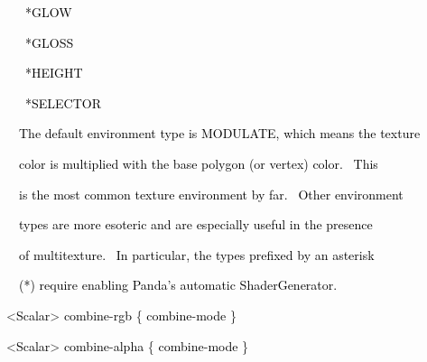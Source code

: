 \documentclass[a4paper]{article}
\newcommand\textstyleOOoComputerKeyWord[1]{\textrm{\textcolor[rgb]{0.0,0.0,0.5019608}{#1}}}
\newcommand\textstyleOOoAssemblerSpecialChar[1]{\textrm{\textcolor[rgb]{0.0,0.5019608,0.0}{#1}}}
\newcommand\textstyleOOoAssemblerIdent[1]{\textrm{\textcolor{black}{#1}}}
\begin{document}
{\color{black}
\textstyleOOoComputerKeyWord{\textcolor{black}{\ \ \ \ \ *GLOW}}}

{\color{black}
\textstyleOOoComputerKeyWord{\textcolor{black}{\ \ \ \ \ *GLOSS}}}

{\color{black}
\textstyleOOoComputerKeyWord{\textcolor{black}{\ \ \ \ \ *HEIGHT}}}

{\color{black}
\textstyleOOoComputerKeyWord{\textcolor{black}{\ \ \ \ \ *SELECTOR}}}


\bigskip

{\color{black}
\textstyleOOoComputerKeyWord{\textcolor{black}{\ \ \ \ The default environment type is MODULATE, which means the
texture}}}

{\color{black}
\textstyleOOoComputerKeyWord{\textcolor{black}{\ \ \ \ color is multiplied with the base polygon (or vertex) color.
\ This}}}

{\color{black}
\textstyleOOoComputerKeyWord{\textcolor{black}{\ \ \ \ is the most common texture environment by far. \ Other
environment}}}

{\color{black}
\textstyleOOoComputerKeyWord{\textcolor{black}{\ \ \ \ types are more esoteric and are especially useful in the
presence}}}

{\color{black}
\textstyleOOoComputerKeyWord{\textcolor{black}{\ \ \ \ of multitexture. \ In particular, the types prefixed by an
asterisk}}}

{\color{black}
\textstyleOOoComputerKeyWord{\textcolor{black}{\ \ \ \ (*) require enabling Panda's automatic ShaderGenerator.}}}


\bigskip

{\color{black}
\textstyleOOoComputerKeyWord{\textcolor{black}{\ \ }}\textstyleOOoAssemblerSpecialChar{{\textless}}\textstyleOOoAssemblerIdent{Scalar}\textstyleOOoAssemblerSpecialChar{{\textgreater}}\textstyleOOoComputerKeyWord{\textcolor{black}{
}}\textstyleOOoAssemblerIdent{combine}\textstyleOOoAssemblerSpecialChar{{}-}\textstyleOOoAssemblerIdent{rgb}\textstyleOOoComputerKeyWord{\textcolor{black}{
}}\textstyleOOoAssemblerSpecialChar{\{}\textstyleOOoComputerKeyWord{\textcolor{black}{
}}\textstyleOOoAssemblerIdent{combine}\textstyleOOoAssemblerSpecialChar{{}-}\textstyleOOoAssemblerIdent{mode}\textstyleOOoComputerKeyWord{\textcolor{black}{
}}\textstyleOOoAssemblerSpecialChar{\}}}

{\color{black}
\textstyleOOoComputerKeyWord{\textcolor{black}{\ \ }}\textstyleOOoAssemblerSpecialChar{{\textless}}\textstyleOOoAssemblerIdent{Scalar}\textstyleOOoAssemblerSpecialChar{{\textgreater}}\textstyleOOoComputerKeyWord{\textcolor{black}{
}}\textstyleOOoAssemblerIdent{combine}\textstyleOOoAssemblerSpecialChar{{}-}\textstyleOOoAssemblerIdent{alpha}\textstyleOOoComputerKeyWord{\textcolor{black}{
}}\textstyleOOoAssemblerSpecialChar{\{}\textstyleOOoComputerKeyWord{\textcolor{black}{
}}\textstyleOOoAssemblerIdent{combine}\textstyleOOoAssemblerSpecialChar{{}-}\textstyleOOoAssemblerIdent{mode}\textstyleOOoComputerKeyWord{\textcolor{black}{
}}\textstyleOOoAssemblerSpecialChar{\}}}
\end{document}
